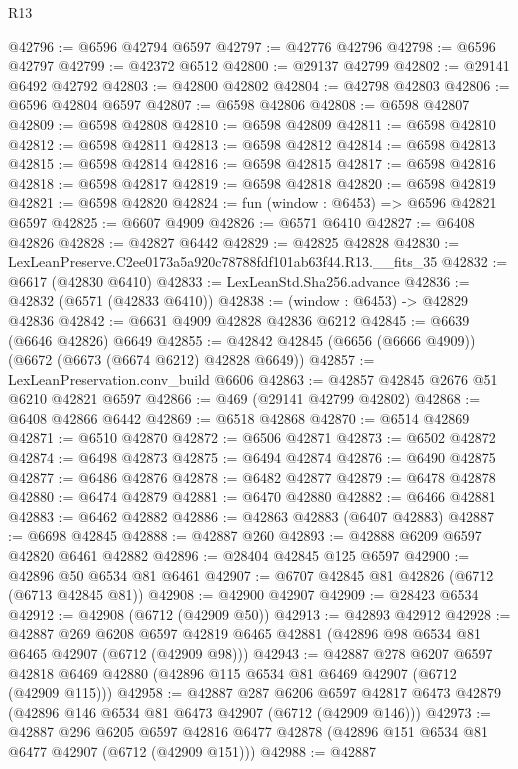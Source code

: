 \begin{lexlean}{R13}
\begin{coremodule}
@42796 := @6596 @42794 @6597
@42797 := @42776 @42796
@42798 := @6596 @42797
@42799 := @42372 @6512
@42800 := @29137 @42799
@42802 := @29141 @6492 @42792
@42803 := @42800 @42802
@42804 := @42798 @42803
@42806 := @6596 @42804 @6597
@42807 := @6598 @42806
@42808 := @6598 @42807
@42809 := @6598 @42808
@42810 := @6598 @42809
@42811 := @6598 @42810
@42812 := @6598 @42811
@42813 := @6598 @42812
@42814 := @6598 @42813
@42815 := @6598 @42814
@42816 := @6598 @42815
@42817 := @6598 @42816
@42818 := @6598 @42817
@42819 := @6598 @42818
@42820 := @6598 @42819
@42821 := @6598 @42820
@42824 := fun (window : @6453) => @6596 @42821 @6597
@42825 := @6607 @4909
@42826 := @6571 @6410
@42827 := @6408 @42826
@42828 := @42827 @6442
@42829 := @42825 @42828
@42830 := LexLeanPreserve.C2ee0173a5a920c78788fdf101ab63f44.R13.__fits_35
@42832 := @6617 (@42830 @6410)
@42833 := LexLeanStd.Sha256.advance
@42836 := @42832 (@6571 (@42833 @6410))
@42838 := (window : @6453) -> @42829 @42836
@42842 := @6631 @4909 @42828 @42836 @6212
@42845 := @6639 (@6646 @42826) @6649
@42855 := @42842 @42845 (@6656 (@6666 @4909)) (@6672 (@6673 (@6674 @6212) @42828 @6649))
@42857 := LexLeanPreservation.conv_build @6606
@42863 := @42857 @42845 @2676 @51 @6210 @42821 @6597
@42866 := @469 (@29141 @42799 @42802)
@42868 := @6408 @42866 @6442
@42869 := @6518 @42868
@42870 := @6514 @42869
@42871 := @6510 @42870
@42872 := @6506 @42871
@42873 := @6502 @42872
@42874 := @6498 @42873
@42875 := @6494 @42874
@42876 := @6490 @42875
@42877 := @6486 @42876
@42878 := @6482 @42877
@42879 := @6478 @42878
@42880 := @6474 @42879
@42881 := @6470 @42880
@42882 := @6466 @42881
@42883 := @6462 @42882
@42886 := @42863 @42883 (@6407 @42883)
@42887 := @6698 @42845
@42888 := @42887 @260
@42893 := @42888 @6209 @6597 @42820 @6461 @42882
@42896 := @28404 @42845 @125 @6597
@42900 := @42896 @50 @6534 @81 @6461
@42907 := @6707 @42845 @81 @42826 (@6712 (@6713 @42845 @81))
@42908 := @42900 @42907
@42909 := @28423 @6534
@42912 := @42908 (@6712 (@42909 @50))
@42913 := @42893 @42912
@42928 := @42887
    @269
    @6208
    @6597
    @42819
    @6465
    @42881
    (@42896 @98 @6534 @81 @6465 @42907 (@6712 (@42909 @98)))
@42943 := @42887
    @278
    @6207
    @6597
    @42818
    @6469
    @42880
    (@42896 @115 @6534 @81 @6469 @42907 (@6712 (@42909 @115)))
@42958 := @42887
    @287
    @6206
    @6597
    @42817
    @6473
    @42879
    (@42896 @146 @6534 @81 @6473 @42907 (@6712 (@42909 @146)))
@42973 := @42887
    @296
    @6205
    @6597
    @42816
    @6477
    @42878
    (@42896 @151 @6534 @81 @6477 @42907 (@6712 (@42909 @151)))
@42988 := @42887

\end{coremodule}
\end{lexlean}
